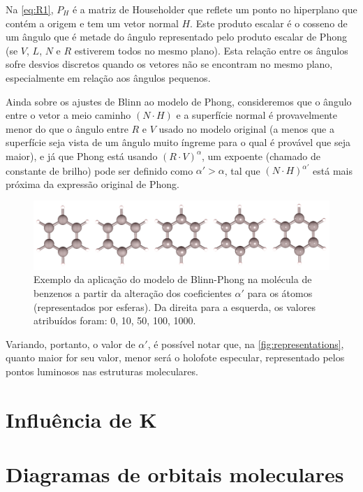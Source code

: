 Na \autoref{eq:R1}, $P_H$ é a matriz de Householder que reflete um ponto no hiperplano que contém a origem e tem um vetor normal $H$. Este produto escalar é o cosseno de um ângulo que é metade do ângulo representado pelo produto escalar de Phong (se $V$, $L$, $N$ e $R$ estiverem todos no mesmo plano). Esta relação entre os ângulos sofre desvios discretos quando os vetores não se encontram no mesmo plano, especialmente em relação aos ângulos pequenos.

Ainda sobre os ajustes de Blinn ao modelo de Phong, consideremos que o ângulo entre o vetor a meio caminho $(N \cdot H)$ e a superfície normal é provavelmente menor do que o ângulo entre $R$ e $V$ usado no modelo original (a menos que a superfície seja vista de um ângulo muito íngreme para o qual é provável que seja maior), e já que Phong está usando $(R \cdot V)^\alpha$, um expoente (chamado de constante de brilho) pode ser definido como $\alpha' > \alpha$, tal que $(N \cdot H)^{\alpha'}$ está mais próxima da expressão original de Phong.

\begin{figure}[htb]
\caption{\label{fig:representations} Exemplo da aplicação do modelo de Blinn-Phong na molécula de benzenos a partir da alteração dos coeficientes $\alpha'$ para os átomos (representados por esferas). Da direita para a esquerda, os valores atribuídos foram: 0, 10, 50, 100, 1000.}
	\begin{center}
		\includegraphics[width=1.0\textwidth]{images/shininess(1).png}
	\end{center}
\end{figure}

Variando, portanto, o valor de $\alpha'$, é possível notar que, na \autoref{fig:representations}, quanto maior for seu valor, menor será o holofote especular, representado pelos pontos luminosos nas estruturas moleculares.

\section{Influência de K}

\section{Diagramas de orbitais moleculares}

